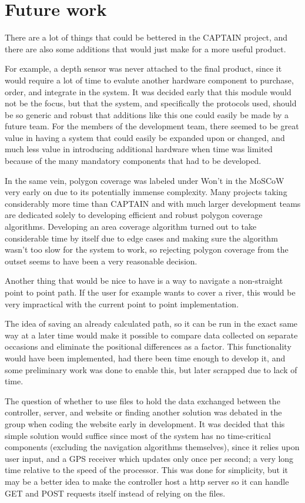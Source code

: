 \chapter{Future work}
There are a lot of things that could be bettered in the CAPTAIN project, and there are also some additions that would just make for a more useful product.

For example, a depth sensor was never attached to the final product, since it would require a lot of time to evalute another hardware component to purchase, order, and integrate in the system. It was decided early that this module would not be the focus, but that the system, and specifically the protocols used, should be so generic and robust that additions like this one could easily be made by a future team. For the members of the development team, there seemed to be great value in having a system that could easily be expanded upon or changed, and much less value in introducing additional hardware when time was limited because of the many mandatory components that had to be developed. 

In the same vein, polygon coverage was labeled under Won't in the MoSCoW very early on due to its potentially immense complexity. Many projects taking considerably more time than CAPTAIN and with much larger development teams are dedicated solely to developing efficient and robust polygon coverage algorithms. Developing an area coverage algorithm turned out to take considerable time by itself due to edge cases and making sure the algorithm wasn't too slow for the system to work, so rejecting polygon coverage from the outset seems to have been a very reasonable decision.

Another thing that would be nice to have is a way to navigate a non-straight point to point path. If the user for example wants to cover a river, this would be very impractical with the current point to point implementation. 

The idea of saving an already calculated path, so it can be run in the exact same way at a later time would make it possible to compare data collected on separate occasions and eliminate the positional differences as a factor. This functionality would have been implemented, had there been time enough to develop it, and some preliminary work was done to enable this, but later scrapped due to lack of time.

The question of whether to use files to hold the data exchanged between the controller, server, and website or finding another solution was debated in the group when coding the website early in development. It was decided that this simple solution would suffice since most of the system has no time-critical components (excluding the navigation algorithms themselves), since it relies upon user input, and a GPS receiver which updates only once per second; a very long time relative to the speed of the processor. This was done for simplicity, but it may be a better idea to make the controller host a http server so it can handle GET and POST requests itself instead of relying on the files. 

